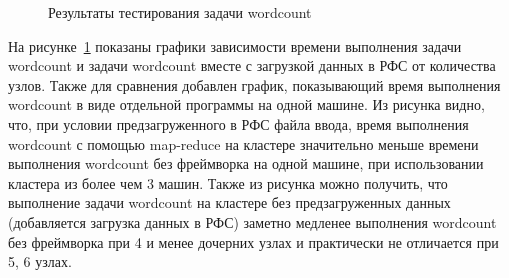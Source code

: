 \documentclass[12pt,a4paper,oneside]{extarticle}
\begin{document}
    \begin{figure}[h!]
        
        \centering
        \caption{Результаты тестирования задачи wordcount}
        \label{pic:test_2}
    \end{figure}

    На рисунке~\ref{pic:test_2} показаны графики зависимости времени выполнения задачи wordcount и задачи wordcount вместе с загрузкой данных в РФС  от количества узлов. Также для сравнения добавлен график, показывающий время выполнения wordcount в виде отдельной программы на одной машине. Из рисунка видно, что, при условии предзагруженного в РФС файла ввода, время выполнения wordcount с помощью map-reduce на кластере значительно меньше времени выполнения wordcount без фреймворка на одной машине, при использовании кластера из более чем 3 машин. Также из рисунка можно получить, что выполнение задачи wordcount на кластере без предзагруженных данных (добавляется загрузка данных в РФС) заметно медленее выполнения wordcount без фреймворка при 4 и менее дочерних узлах и практически не отличается при 5, 6 узлах.
\end{document}
